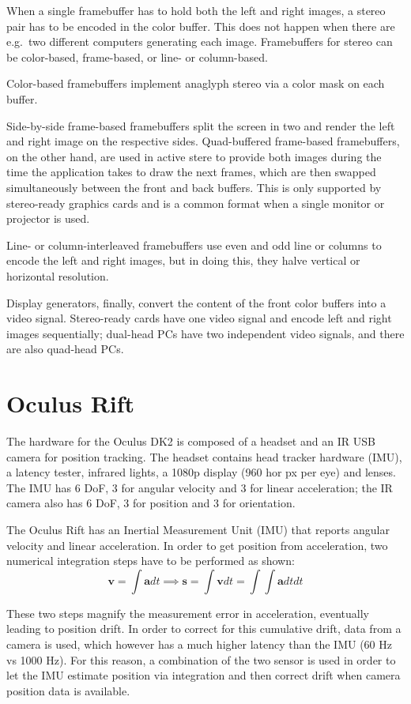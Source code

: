 \documentclass[a4paper]{article}
\begin{document}
When a single framebuffer has to hold both the left and right images, a
stereo pair has to be encoded in the color buffer. This does not happen
when there are e.g.~two different computers generating each image.
Framebuffers for stereo can be color-based, frame-based, or line- or
column-based.

Color-based framebuffers implement anaglyph stereo via a color mask on
each buffer.

Side-by-side frame-based framebuffers split the screen in two and render
the left and right image on the respective sides. Quad-buffered
frame-based framebuffers, on the other hand, are used in active stere to
provide both images during the time the application takes to draw the
next frames, which are then swapped simultaneously between the front and
back buffers. This is only supported by stereo-ready graphics cards and
is a common format when a single monitor or projector is used.

Line- or column-interleaved framebuffers use even and odd line or
columns to encode the left and right images, but in doing this, they
halve vertical or horizontal resolution.

Display generators, finally, convert the content of the front color
buffers into a video signal. Stereo-ready cards have one video signal
and encode left and right images sequentially; dual-head PCs have two
independent video signals, and there are also quad-head PCs.


\section{Oculus Rift}

The hardware for the Oculus DK2 is composed of a headset and an IR USB
camera for position tracking. The headset contains head tracker hardware
(IMU), a latency tester, infrared lights, a 1080p display (960 hor px
per eye) and lenses. The IMU has 6 DoF, 3 for angular velocity and 3 for
linear acceleration; the IR camera also has 6 DoF, 3 for position and 3
for orientation.

The Oculus Rift has an Inertial Measurement Unit (IMU) that reports
angular velocity and linear acceleration. In order to get position from
acceleration, two numerical integration steps have to be performed as
shown: \[
\mathbf{v} = \int \mathbf{a} dt \implies \mathbf{s} = \int \mathbf{v} dt = \int \int \mathbf{a} dt dt
\]

These two steps magnify the measurement error in acceleration,
eventually leading to position drift. In order to correct for this
cumulative drift, data from a camera is used, which however has a much
higher latency than the IMU (60 Hz vs 1000 Hz). For this reason, a
combination of the two sensor is used in order to let the IMU estimate
position via integration and then correct drift when camera position
data is available.
\end{document}
